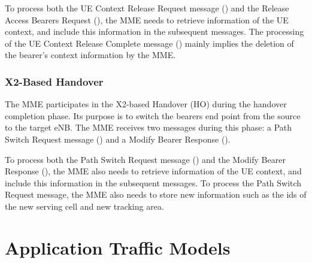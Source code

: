 \documentclass[conference]{IEEEtran}
\begin{document}
To process both the UE Context Release Request message () and the Release Access Bearers Request (), the MME needs to retrieve information of the UE context, and include this information in the subsequent messages. The processing of the UE Context Release Complete message () mainly implies the deletion of the bearer's context information by the MME.

\subsubsection{X2-Based Handover}
  
The MME participates in the X2-based Handover (HO) during the handover completion phase. Its purpose is to switch the bearers end point from the source to the target eNB. The MME receives two messages during this phase: a Path Switch Request message () and a  Modify Bearer Response ().



To process both the Path Switch Request message () and the Modify Bearer Response (), the MME also needs to retrieve information of the UE context, and include this information in the subsequent messages. To process the Path Switch Request message, the MME also needs to store new information such as the ids of the new serving cell and new tracking area.









\section{Application Traffic Models}
\label{sec:traffic-models}
\end{document}
